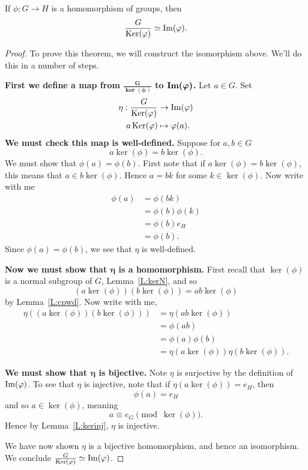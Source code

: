 \documentclass{ximera}
\begin{document}
\begin{theorem}\label{T:NI}
  If $\phi:G\to H$ is a homomorphism of groups, then
  \[
  \frac{G}{\mathop{\mathrm{Ker}}\nolimits(\varphi)} \simeq \operatorname{Im}(\varphi).
  \]
  \begin{proof}
    To prove this theorem, we will construct the isomorphism
    above. We'll do this in a number of steps.


    \textbf{First we define a map from
      $\boldsymbol{\frac{G}{\ker(\phi)}}$ to
      $\boldsymbol{\operatorname{Im}(\varphi)}$.}  Let $a\in G$. Set
    \begin{align*}
      \eta: \frac{G}{\mathop{\mathrm{Ker}}\nolimits(\varphi)} &\to \operatorname{Im}(\varphi)\\
      a\mathop{\mathrm{Ker}}\nolimits(\varphi) &\mapsto \varphi(a).
    \end{align*}
    \textbf{We must check this map is
      well-defined.} Suppose for $a,b\in G$
    \[
    a \ker(\phi) = b\ker(\phi).
    \]
    We must show that $\phi(a) = \phi(b)$. First note that if $a
    \ker(\phi) = b\ker(\phi)$, this means that $a\in
    b\ker(\phi)$. Hence $a = bk$ for some $k\in\ker(\phi)$. Now write
    with me
    \begin{align*}
      \phi(a) &=\phi(bk)\\
      &=\phi(b)\phi(k)\\
      &=\phi(b) e_H\\
      &=\phi(b).
    \end{align*}
    Since $\phi(a) = \phi(b)$, we see that $\eta$ is well-defined.


    
    \textbf{Now we must show that $\boldsymbol\eta$ is a
      homomorphism.} First recall that $\ker(\phi)$ is a normal
    subgroup of $G$, Lemma~\ref{L:kerN}, and so
    \[
    (a\ker(\phi)) (b\ker(\phi))  =  ab\ker(\phi)
    \]
    by Lemma~\ref{L:cpwd}.  Now write with me,
    \begin{align*}
    \eta\left((a\ker(\phi))( b\ker(\phi))\right) &= \eta(ab\ker(\phi))\\
    &= \phi(ab)\\
    &= \phi(a)\phi(b)\\
    &= \eta(a\ker(\phi)) \eta(b\ker(\phi)).
    \end{align*}



    \textbf{We must show that $\boldsymbol\eta$ is bijective.} Note
    $\eta$ is surjective by the definition of $\operatorname{Im}(\varphi)$.  To see that
    $\eta$ is injective, note that if $\eta(a\ker(\phi)) = e_H$, then
    \[
    \phi(a) = e_H
    \]
    and so $a\in \ker(\phi)$, meaning
    \[
    a\equiv e_G \pmod{\ker(\phi)}.
    \]
    Hence by Lemma~\ref{L:kerinj}, $\eta$ is injective.

    We have now shown $\eta$ is a bijective homomorphism, and hence an
    isomorphism. We conclude $\frac{G}{\mathop{\mathrm{Ker}}\nolimits(\varphi)} \simeq \operatorname{Im}(\varphi)$.
  \end{proof}
\end{theorem}
\end{document}
